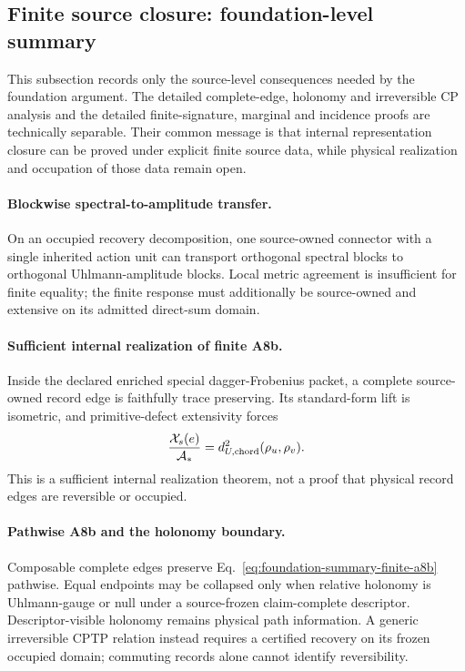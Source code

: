 \documentclass[11pt]{article}
\begin{document}
\subsection{Finite source closure: foundation-level summary}
\label{sec:a8-source-selection}

This subsection records only the source-level consequences needed by the
foundation argument.  The detailed complete-edge, holonomy and irreversible
CP analysis and the detailed finite-signature, marginal and incidence proofs
are technically separable.  Their common message is that internal
representation closure can be proved under explicit finite source data, while
physical realization and occupation of those data remain open.

\paragraph{Blockwise spectral-to-amplitude transfer.}
On an occupied recovery decomposition, one source-owned connector with a
single inherited action unit can transport orthogonal spectral blocks to
orthogonal Uhlmann-amplitude blocks.  Local metric agreement is insufficient
for finite equality; the finite response must additionally be source-owned
and extensive on its admitted direct-sum domain.

\paragraph{Sufficient internal realization of finite A8b.}
Inside the declared enriched special dagger-Frobenius packet, a complete
source-owned record edge is faithfully trace preserving.  Its standard-form
lift is isometric, and primitive-defect extensivity forces
\begin{equation}
 \frac{\mathcal X_s(e)}{\mathcal A_*}
 =d_{U,{\rm chord}}^2(\rho_u,\rho_v).
 \label{eq:foundation-summary-finite-a8b}
\end{equation}
This is a sufficient internal realization theorem, not a proof that physical
record edges are reversible or occupied.

\paragraph{Pathwise A8b and the holonomy boundary.}
Composable complete edges preserve Eq.~\eqref{eq:foundation-summary-finite-a8b}
pathwise.  Equal endpoints may be collapsed only when relative holonomy is
Uhlmann-gauge or null under a source-frozen claim-complete descriptor.
Descriptor-visible holonomy remains physical path information.  A generic
irreversible CPTP relation instead requires a certified recovery on its frozen
occupied domain; commuting records alone cannot identify reversibility.
\end{document}
